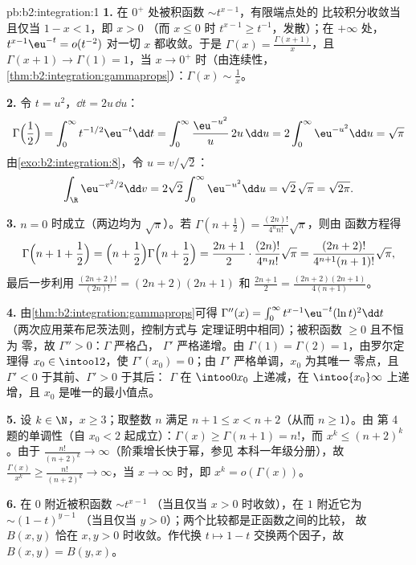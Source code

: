 \begin{solution}{pb:b2:integration:1}
\textbf{1.} 在 $0^+$ 处被积函数 $\sim t^{x-1}$，有限端点处的
比较积分收敛当且仅当 $1 - x < 1$，即 $x > 0$
（而 $x \leq 0$ 时 $t^{x-1} \geq t^{-1}$，发散）；在
$+\infty$ 处，$t^{x-1}\eu^{-t} = o(t^{-2})$ 对一切
$x$ 都收敛。于是 $\Gamma(x) = \frac{\Gamma(x+1)}{x}$，且 $\Gamma(x+1)
\to \Gamma(1) = 1$，当 $x \to 0^+$ 时（由连续性，
\cref{thm:b2:integration:gammaprops}）：$\Gamma(x) \sim
\frac1x$。

\textbf{2.} 令 $t = u^2$，$\dd t = 2u\,\dd u$：
\[
\Gamma\Bigl(\frac12\Bigr) = \int_0^\infty
t^{-1/2}\eu^{-t}\dd t
= \int_0^\infty \frac{\eu^{-u^2}}{u}\,2u\,\dd u
= 2\int_0^\infty \eu^{-u^2}\dd u = \sqrt\pi
\]
由\cref{exo:b2:integration:8}，令 $u = v/\sqrt2$：
\[
\int_\R \eu^{-v^2/2}\dd v
= 2\sqrt2\int_0^\infty \eu^{-u^2}\dd u
= \sqrt2\,\sqrt\pi = \sqrt{2\pi} .
\]

\textbf{3.} $n = 0$ 时成立（两边均为 $\sqrt\pi$）。若
$\Gamma(n + \frac12) = \frac{(2n)!}{4^n n!}\sqrt\pi$，则由
函数方程得
\[
\Gamma\Bigl(n + 1 + \frac12\Bigr)
= \Bigl(n + \frac12\Bigr)\Gamma\Bigl(n + \frac12\Bigr)
= \frac{2n+1}{2}\cdot\frac{(2n)!}{4^n n!}\sqrt\pi
= \frac{(2n+2)!}{4^{n+1}(n+1)!}\sqrt\pi ,
\]
最后一步利用 $\frac{(2n+2)!}{(2n)!} = (2n+2)(2n+1)$
和 $\frac{2n+1}{2} = \frac{(2n+2)(2n+1)}{4(n+1)}$。

\textbf{4.} 由\cref{thm:b2:integration:gammaprops}可得
$\Gamma''(x) = \int_0^\infty t^{x-1}\eu^{-t}(\ln t)^2\dd t$
（两次应用莱布尼茨法则，控制方式与
定理证明中相同）；被积函数 $\geq 0$ 且不恒为
零，故 $\Gamma'' > 0$：$\Gamma$ 严格凸，
$\Gamma'$ 严格递增。由 $\Gamma(1) = \Gamma(2)
= 1$，由罗尔定理得 $x_0 \in \intoo12$，使 $\Gamma'(x_0) =
0$；由 $\Gamma'$ 严格单调，$x_0$ 为其唯一
零点，且 $\Gamma' < 0$ 于其前、$\Gamma' > 0$ 于其后：
$\Gamma$ 在 $\intoo0{x_0}$ 上递减，在
$\intoo{x_0}\infty$ 上递增，且 $x_0$ 是唯一的最小值点。

\textbf{5.} 设 $k \in \N$，$x \geq 3$；取整数
$n$ 满足 $n + 1 \leq x < n + 2$（从而 $n \geq 1$）。由
第 4 题的单调性（自 $x_0 < 2$ 起成立）：$\Gamma(x)
\geq \Gamma(n + 1) = n!$，而 $x^k \leq (n+2)^k$。由于
$\frac{n!}{(n+2)^k} \to \infty$（阶乘增长快于幂，参见
本科一年级分册），故 $\frac{\Gamma(x)}{x^k} \geq \frac{n!}{(n+2)^k} \to
\infty$，当 $x \to \infty$ 时，即 $x^k = o(\Gamma(x))$。

\textbf{6.} 在 $0$ 附近被积函数 $\sim t^{x-1}$
（当且仅当 $x > 0$ 时收敛），在 $1$ 附近它为 $\sim (1-t)^{y-1}$
（当且仅当 $y > 0$）；两个比较都是正函数之间的比较，
故 $B(x,y)$ 恰在 $x, y > 0$ 时收敛。作代换
$t \mapsto 1 - t$ 交换两个因子，故 $B(x,y) = B(y,x)$。


\end{solution}
